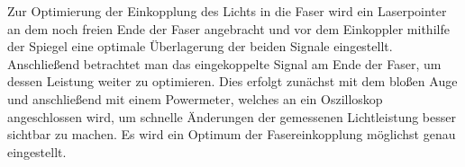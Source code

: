 Zur Optimierung der Einkopplung des Lichts in die Faser wird ein Laserpointer an dem noch freien Ende der Faser angebracht und vor dem Einkoppler mithilfe der Spiegel eine optimale Überlagerung der beiden Signale eingestellt. \\
Anschließend betrachtet man das eingekoppelte Signal am Ende der Faser, um dessen Leistung weiter zu optimieren. Dies erfolgt zunächst mit dem bloßen Auge und anschließend mit einem Powermeter, welches an ein Oszilloskop angeschlossen wird, um schnelle Änderungen der gemessenen Lichtleistung besser sichtbar zu machen. Es wird ein Optimum der Fasereinkopplung möglichst genau eingestellt. 



